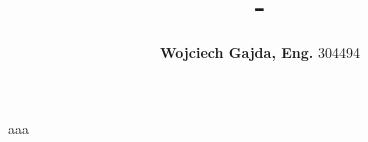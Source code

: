 \documentclass[15pt]{sprawozdanie}
\title{-}
\author{\textbf{Wojciech Gajda, Eng.} 304494}
\begin{document}
%
\maketitle

aaa

%


\end{document}

